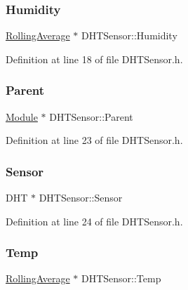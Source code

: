 \subsubsection{\texorpdfstring{Humidity}{Humidity}}
{\footnotesize\ttfamily \hyperlink{class_rolling_average}{Rolling\+Average} $\ast$ D\+H\+T\+Sensor\+::\+Humidity}



Definition at line 18 of file D\+H\+T\+Sensor.\+h.

\mbox{\label{class_d_h_t_sensor_a874672c28d4f4ff9272194c0947c59e6}} 
\subsubsection{\texorpdfstring{Parent}{Parent}}
{\footnotesize\ttfamily \hyperlink{class_module}{Module} $\ast$ D\+H\+T\+Sensor\+::\+Parent\hspace{0.3cm}{\ttfamily [protected]}}



Definition at line 23 of file D\+H\+T\+Sensor.\+h.

\mbox{\label{class_d_h_t_sensor_ac89947c1a67ac87f24c6be9794d35c74}} 
\subsubsection{\texorpdfstring{Sensor}{Sensor}}
{\footnotesize\ttfamily D\+HT $\ast$ D\+H\+T\+Sensor\+::\+Sensor\hspace{0.3cm}{\ttfamily [protected]}}



Definition at line 24 of file D\+H\+T\+Sensor.\+h.

\mbox{\label{class_d_h_t_sensor_ad0ec569d6b968197eccc32b8d9c3cf9c}} 
\subsubsection{\texorpdfstring{Temp}{Temp}}
{\footnotesize\ttfamily \hyperlink{class_rolling_average}{Rolling\+Average} $\ast$ D\+H\+T\+Sensor\+::\+Temp}



